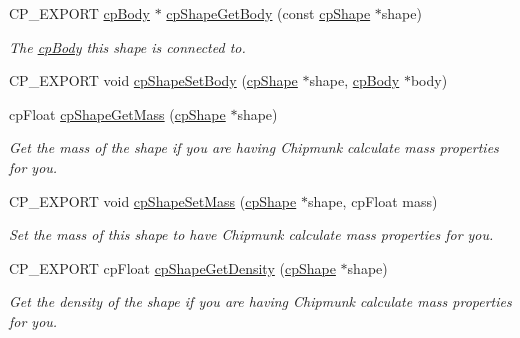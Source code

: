 \begin{DoxyCompactItemize}
C\+P\+\_\+\+E\+X\+P\+O\+RT \hyperlink{structcpBody}{cp\+Body} $\ast$ \hyperlink{group__cpShape_gaa0615b0c5438d7cfec0d73d133e35e8e}{cp\+Shape\+Get\+Body} (const \hyperlink{structcpShape}{cp\+Shape} $\ast$shape)
\begin{DoxyCompactList}\small\item\em The \hyperlink{structcpBody}{cp\+Body} this shape is connected to. \end{DoxyCompactList}\item 
C\+P\+\_\+\+E\+X\+P\+O\+RT void \hyperlink{group__cpShape_ga222501265d75e838459285452a92d6f5}{cp\+Shape\+Set\+Body} (\hyperlink{structcpShape}{cp\+Shape} $\ast$shape, \hyperlink{structcpBody}{cp\+Body} $\ast$body)
\item 
\mbox{\label{group__cpShape_ga5d7f4b7e91b1e7062ae84acb41aa47ba}} 
cp\+Float \hyperlink{group__cpShape_ga5d7f4b7e91b1e7062ae84acb41aa47ba}{cp\+Shape\+Get\+Mass} (\hyperlink{structcpShape}{cp\+Shape} $\ast$shape)
\begin{DoxyCompactList}\small\item\em Get the mass of the shape if you are having Chipmunk calculate mass properties for you. \end{DoxyCompactList}\item 
\mbox{\label{group__cpShape_ga82c8046837b24d08b9ea0b3da6c795a4}} 
C\+P\+\_\+\+E\+X\+P\+O\+RT void \hyperlink{group__cpShape_ga82c8046837b24d08b9ea0b3da6c795a4}{cp\+Shape\+Set\+Mass} (\hyperlink{structcpShape}{cp\+Shape} $\ast$shape, cp\+Float mass)
\begin{DoxyCompactList}\small\item\em Set the mass of this shape to have Chipmunk calculate mass properties for you. \end{DoxyCompactList}\item 
\mbox{\label{group__cpShape_gae9c80582330ded34941ca4890160575c}} 
C\+P\+\_\+\+E\+X\+P\+O\+RT cp\+Float \hyperlink{group__cpShape_gae9c80582330ded34941ca4890160575c}{cp\+Shape\+Get\+Density} (\hyperlink{structcpShape}{cp\+Shape} $\ast$shape)
\begin{DoxyCompactList}\small\item\em Get the density of the shape if you are having Chipmunk calculate mass properties for you. \end{DoxyCompactList}\item 
\mbox{\label{group__cpShape_ga6b52b02dd8c60fb33713869ef5bba948}} 

\end{DoxyCompactItemize}
